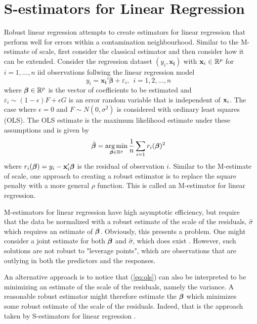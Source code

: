 

\section{S-estimators for Linear Regression}

\newtheorem{lem}{Lemma}

Robust linear regression attempts to create estimators for linear regression that perform well for errors within a contamination neighbourhood. Similar to the M-estimate of scale, first consider the classical estimator and then consider how it can be extended. Consider the regression dataset $(y_i, \mathbf{x_i})$ with $\mathbf{x}_i \in \mathbb{R}^p$ for $i = 1,\hdots,n$ iid observations follwing the linear regression model
\begin{equation}
\label{eq:linRegr}
    y_i = \mathbf{x_i}' \boldsymbol{\beta} + \varepsilon_i,\ \ i = 1,2,\hdots,n
\end{equation}
where $\bm{\beta} \in \mathbb{R}^p$ is the vector of coefficients to be estimated and $\varepsilon_i \sim (1-\epsilon)F + \epsilon G$ is an error random variable that is independent of $\mathbf{x}_i$. The case where $\epsilon = 0$ and $F \sim N(0,\sigma^2)$ is considered with ordinary least squares (OLS). The OLS estimate is the maximum likelihood estimate under these assumptions and is given by
\begin{equation}
\label{eq:ols}
    \hat {\bm{\beta}} = \operatorname*{arg\,min}_{\bm{\beta} \in \mathbb{R}^p} \frac{1}{n} \sum_{i=1} r_i(\bm{\beta})^2
\end{equation}
where $r_i(\bm{\beta}) = y_i - \mathbf{x}_i'\bm{\beta}$ is the residual of observation $i$. Similar to the M-estimate of scale, one approach to creating a robust estimator is to replace the square penalty with a more general $\rho$ function. This is called an M-estimator for linear regression. 

M-estimators for linear regression have high asymptotic efficiency, but require that the data be normalized with a robust estimate of the scale of the residuals, $\hat\sigma$ which requires an estimate of $\bm{\beta}$. Obviously, this presents a problem. One might consider a joint estimate for both $\bm{\beta}$ and $\hat\sigma$, which does exist \cite{maronna2019robust}. However, such solutions are not robust to "leverage points", which are observations that are outlying in both the predictors and the responses.

An alternative approach is to notice that (\ref{eq:ols}) can also be interpreted to be minimizing an estimate of the scale of the residuals, namely the variance. A reasonable robust estimator might therefore estimate the $\bm{\beta}$ which minimizes some robust estimate of the scale of the residuals. Indeed, that is the approach taken by S-estimators for linear regression \cite{rousseeuw1984robust}.

